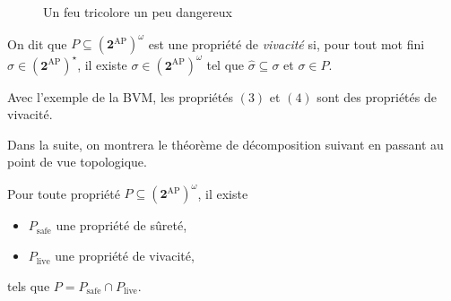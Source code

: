 \documentclass[./main]{subfiles}
\begin{document}
  \begin{figure}
    \centering
    \caption{Un feu tricolore un peu dangereux}
    \label{fig:one-state-trafic-light}
  \end{figure}

  \begin{defn}[Vivacité]
    On dit que $P \subseteq (\mathbf{2}^\mathrm{AP})^\omega$ est une propriété de \textit{vivacité} si, pour tout mot fini $\hat{\sigma} \in (\mathbf{2}^\mathrm{AP})^\star$, il existe $\sigma \in (\mathbf{2}^\mathrm{AP})^\omega$ tel que $\hat{\sigma} \subseteq \sigma$ et $\sigma \in P$.
  \end{defn}

  \begin{exm}
    Avec l'exemple de la BVM, les propriétés $(3)$ et $(4)$ sont des propriétés de vivacité.
  \end{exm}

  Dans la suite, on montrera le théorème de décomposition suivant en passant au point de vue topologique.

  \begin{thm}
    Pour toute propriété $P \subseteq (\mathbf{2}^\mathrm{AP})^\omega$, il existe
    \begin{itemize}
      \item  $P_\mathrm{safe}$ une propriété de sûreté,
      \item  $P_\mathrm{live}$ une propriété de vivacité,
    \end{itemize}
    tels que $P = P_\mathrm{safe} \cap P_\mathrm{live}$.
  \end{thm}
\end{document}
